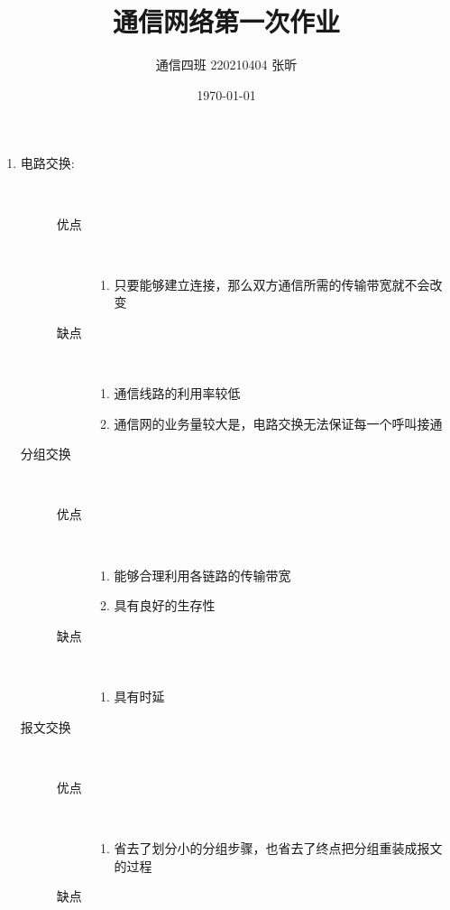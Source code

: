 \documentclass{article}
\title{\zihao{2}通信网络第一次作业}
\author{通信四班 220210404 张昕}
\date{\today}
\begin{document}
\maketitle
{}
\begin{enumerate}
    \item \begin{description}
        \item[电路交换:]~ \begin{description}
            \item[优点] ~\begin{enumerate}
                \item 只要能够建立连接，那么双方通信所需的传输带宽就不会改变 
            \end{enumerate}
            \item[缺点]~ \begin{enumerate}
                \item 通信线路的利用率较低
                \item 通信网的业务量较大是，电路交换无法保证每一个呼叫接通
            \end{enumerate}
        \end{description}
        \item[分组交换] ~\begin{description}
            \item[优点] ~\begin{enumerate}
                \item 能够合理利用各链路的传输带宽
                \item 具有良好的生存性
            \end{enumerate}
            \item[缺点]~ \begin{enumerate}
                \item 具有时延
            \end{enumerate}
        \end{description}
        \item[报文交换] ~\begin{description}
            \item[优点] ~\begin{enumerate}
                \item 省去了划分小的分组步骤，也省去了终点把分组重装成报文的过程
            \end{enumerate}
            \item[缺点]~ \begin{enumerate}

\end{enumerate}
\end{description}
\end{description}
\end{enumerate}
\end{document}
